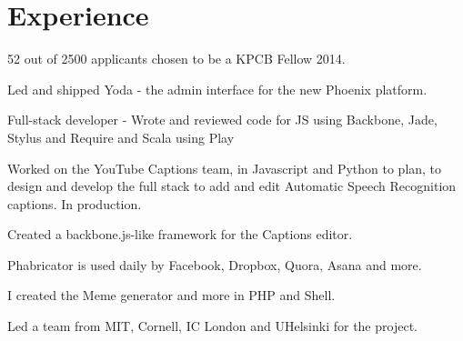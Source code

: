\documentclass[]{deedy-resume-openfont}
\begin{document}
\hfill
\begin{minipage}[t]{0.66\textwidth} 


\section{Experience}
\sectionsep

\vspace{\topsep} %
\begin{tightemize}
\item 52 out of 2500 applicants chosen to be a KPCB Fellow 2014.
\item Led and shipped Yoda - the admin interface for the new Phoenix platform. 
\item Full-stack developer - Wrote and reviewed code for JS using Backbone, Jade, Stylus and Require and Scala using Play
\end{tightemize}
\sectionsep

\begin{tightemize}
\item Worked on the YouTube Captions team, in Javascript and Python to plan, to design and develop the full stack to add and edit Automatic Speech Recognition captions. In production.
\item Created a backbone.js-like framework for the Captions editor.
\end{tightemize}
\sectionsep

\begin{tightemize}
\item Phabricator is used daily by Facebook, Dropbox, Quora, Asana and more.
\item I created the Meme generator and more in PHP and Shell.
\item Led a team from MIT, Cornell, IC London and UHelsinki for the project.
\end{tightemize}
\sectionsep


\end{minipage}
\end{document}
